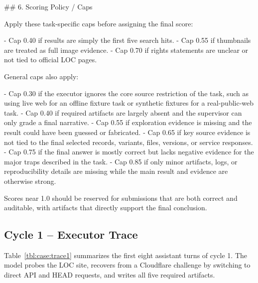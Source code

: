 \begin{clawcode}[title={Eval rule \S6 -- score caps},label={lst:case:eval6}]
## 6. Scoring Policy / Caps

Apply these task-specific caps before assigning the final score:

- Cap 0.40 if results are simply the first five search hits.
- Cap 0.55 if thumbnails are treated as full image evidence.
- Cap 0.70 if rights statements are unclear or not tied to official
  LOC pages.

General caps also apply:

- Cap 0.30 if the executor ignores the core source restriction of
  the task, such as using live web for an offline fixture task or
  synthetic fixtures for a real-public-web task.
- Cap 0.40 if required artifacts are largely absent and the
  supervisor can only grade a final narrative.
- Cap 0.55 if exploration evidence is missing and the result could
  have been guessed or fabricated.
- Cap 0.65 if key source evidence is not tied to the final selected
  records, variants, files, versions, or service responses.
- Cap 0.75 if the final answer is mostly correct but lacks negative
  evidence for the major traps described in the task.
- Cap 0.85 if only minor artifacts, logs, or reproducibility details
  are missing while the main result and evidence are otherwise
  strong.

Scores near 1.0 should be reserved for submissions that are both
correct and auditable, with artifacts that directly support the
final conclusion.
\end{clawcode}

\subsection{Cycle 1 -- Executor Trace}\label{app:case-study:trace1}

Table~\ref{tbl:case:trace1} summarizes the first eight assistant
turns of cycle 1. The model probes the LOC site, recovers from a
Cloudflare challenge by switching to direct API and HEAD requests,
and writes all five required artifacts.

